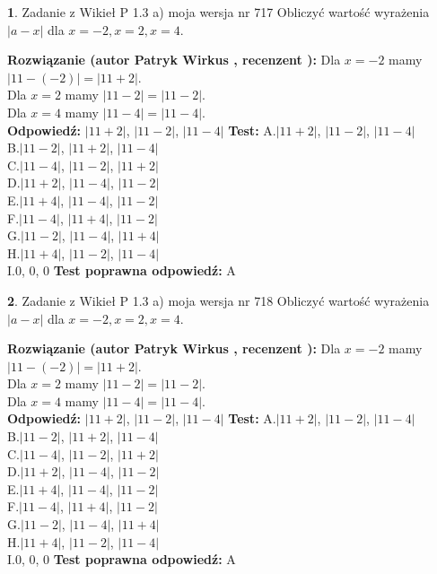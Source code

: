 \documentclass[12pt, a4paper]{article}
\theoremstyle{definition} %
\newtheorem{zad}{}
\newcommand{\zadStart}[1]{\begin{zad}#1\newline}
\newcommand{\zadStop}{\end{zad}}
\newcommand{\rozwStart}[2]{\noindent \textbf{Rozwiązanie (autor #1 , recenzent #2): }\newline}
\newcommand{\rozwStop}{\newline}
\newcommand{\odpStart}{\noindent \textbf{Odpowiedź:}\newline}
\newcommand{\odpStop}{\newline}
\newcommand{\testStart}{\noindent \textbf{Test:}\newline}
\newcommand{\testStop}{\newline}
\newcommand{\kluczStart}{\noindent \textbf{Test poprawna odpowiedź:}\newline}
\newcommand{\kluczStop}{\newline}
\begin{document}
\zadStart{Zadanie z Wikieł P 1.3 a) moja wersja nr 717}
Obliczyć wartość wyrażenia $|a - x|$ dla $x=-2,x=2,x=4$.
\zadStop
\rozwStart{Patryk Wirkus}{}
Dla $x = -2$ mamy $|11 - (-2)| = |11 + 2|$.\\
Dla $x = 2$ mamy $|11 - 2| = |11 - 2|$.\\
Dla $x = 4$ mamy $|11 - 4| = |11 - 4|$.\\
\rozwStop
\odpStart
$|11 + 2|$, $|11 - 2|$, $|11 - 4|$
\odpStop
\testStart
A.$|11 + 2|$, $|11 - 2|$, $|11 - 4|$\\
B.$|11 - 2|$, $|11 + 2|$, $|11 - 4|$\\
C.$|11 - 4|$, $|11 - 2|$, $|11 + 2|$\\
D.$|11 + 2|$, $|11 - 4|$, $|11 - 2|$\\
E.$|11 + 4|$, $|11 - 4|$, $|11 - 2|$\\
F.$|11 - 4|$, $|11 + 4|$, $|11 - 2|$\\
G.$|11 - 2|$, $|11 - 4|$, $|11 + 4|$\\
H.$|11 + 4|$, $|11 - 2|$, $|11 - 4|$\\
I.$0$, $0$, $0$
\testStop
\kluczStart
A
\kluczStop



\zadStart{Zadanie z Wikieł P 1.3 a) moja wersja nr 718}
Obliczyć wartość wyrażenia $|a - x|$ dla $x=-2,x=2,x=4$.
\zadStop
\rozwStart{Patryk Wirkus}{}
Dla $x = -2$ mamy $|11 - (-2)| = |11 + 2|$.\\
Dla $x = 2$ mamy $|11 - 2| = |11 - 2|$.\\
Dla $x = 4$ mamy $|11 - 4| = |11 - 4|$.\\
\rozwStop
\odpStart
$|11 + 2|$, $|11 - 2|$, $|11 - 4|$
\odpStop
\testStart
A.$|11 + 2|$, $|11 - 2|$, $|11 - 4|$\\
B.$|11 - 2|$, $|11 + 2|$, $|11 - 4|$\\
C.$|11 - 4|$, $|11 - 2|$, $|11 + 2|$\\
D.$|11 + 2|$, $|11 - 4|$, $|11 - 2|$\\
E.$|11 + 4|$, $|11 - 4|$, $|11 - 2|$\\
F.$|11 - 4|$, $|11 + 4|$, $|11 - 2|$\\
G.$|11 - 2|$, $|11 - 4|$, $|11 + 4|$\\
H.$|11 + 4|$, $|11 - 2|$, $|11 - 4|$\\
I.$0$, $0$, $0$
\testStop
\kluczStart
A
\kluczStop
\end{document}
